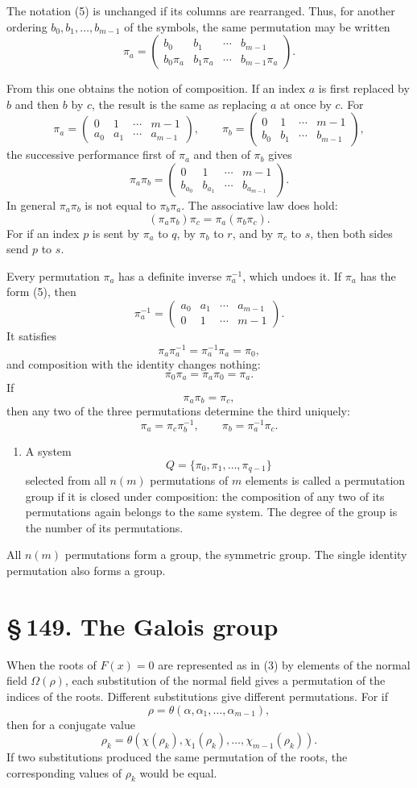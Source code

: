\documentclass[11pt]{article}
\providecommand{\sect}[2]{\section*{\S\,#1. #2}}
\providecommand{\perm}[2]{\begin{pmatrix}#1\\#2\end{pmatrix}}
\begin{document}
The notation (5) is unchanged if its columns are rearranged. Thus, for another ordering $b_0,b_1,
\ldots,b_{m-1}$ of the symbols, the same permutation may be written
\[
        \pi_a=\perm{b_0&b_1&\cdots&b_{m-1}}{b_0\pi_a&b_1\pi_a&\cdots&b_{m-1}\pi_a}.
\tag{6}
\]

From this one obtains the notion of composition. If an index $a$ is first replaced by $b$ and then $b$ by $c$, the result is the same as replacing $a$ at once by $c$. For
\[
        \pi_a=\perm{0&1&\cdots&m-1}{a_0&a_1&\cdots&a_{m-1}},
        \qquad
        \pi_b=\perm{0&1&\cdots&m-1}{b_0&b_1&\cdots&b_{m-1}},
\]
the successive performance first of $\pi_a$ and then of $\pi_b$ gives
\[
        \pi_a\pi_b=\perm{0&1&\cdots&m-1}{b_{a_0}&b_{a_1}&\cdots&b_{a_{m-1}}}.
\tag{7}
\]
In general $\pi_a\pi_b$ is not equal to $\pi_b\pi_a$. The associative law does hold:
\[
        (\pi_a\pi_b)\pi_c=\pi_a(\pi_b\pi_c).
\tag{8}
\]
For if an index $p$ is sent by $\pi_a$ to $q$, by $\pi_b$ to $r$, and by $\pi_c$ to $s$, then both sides send $p$ to $s$.

Every permutation $\pi_a$ has a definite inverse $\pi_a^{-1}$, which undoes it. If $\pi_a$ has the form (5), then
\[
        \pi_a^{-1}=\perm{a_0&a_1&\cdots&a_{m-1}}{0&1&\cdots&m-1}.
\tag{9}
\]
It satisfies
\[
        \pi_a\pi_a^{-1}=\pi_a^{-1}\pi_a=\pi_0,
\tag{10}
\]
and composition with the identity changes nothing:
\[
        \pi_0\pi_a=\pi_a\pi_0=\pi_a.
\tag{11}
\]
If
\[
        \pi_a\pi_b=\pi_c,
\tag{12}
\]
then any two of the three permutations determine the third uniquely:
\[
        \pi_a=\pi_c\pi_b^{-1},\qquad
        \pi_b=\pi_a^{-1}\pi_c.
\tag{13}
\]

\begin{enumerate}[label=\arabic*.,leftmargin=2em,start=3]
\item A system
\[
        Q=\{\pi_0,\pi_1,
\ldots,\pi_{q-1}\}
\]
selected from all $n(m)$ permutations of $m$ elements is called a permutation group if it is closed under composition: the composition of any two of its permutations again belongs to the same system. The degree of the group is the number of its permutations.
\end{enumerate}

All $n(m)$ permutations form a group, the symmetric group. The single identity permutation also forms a group.

\sect{149}{The Galois group}

When the roots of $F(x)=0$ are represented as in (3) by elements of the normal field $\Omega(\rho)$, each substitution of the normal field gives a permutation of the indices of the roots. Different substitutions give different permutations. For if
\[
        \rho=\theta(\alpha,\alpha_1,
\ldots,
\alpha_{m-1}),
\tag{1}
\]
then for a conjugate value
\[
        \rho_k=\theta(\chi(\rho_k),\chi_1(\rho_k),\ldots,\chi_{m-1}(\rho_k)).
\tag{2}
\]
If two substitutions produced the same permutation of the roots, the corresponding values of $\rho_k$ would be equal.
\end{document}
